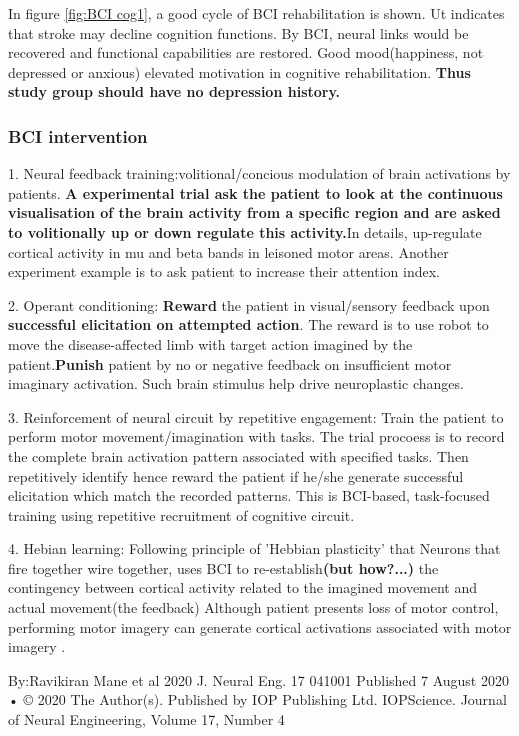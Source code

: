 \documentclass{article}
\begin{document}
In figure \ref{fig:BCI cog1}, a good cycle of BCI rehabilitation is shown. Ut indicates that stroke may decline cognition functions. By BCI, neural links would be recovered and functional capabilities are restored. Good mood(happiness, not depressed or anxious) elevated motivation in cognitive rehabilitation. \textbf{Thus study group should have no depression history.} \par

\subsubsection{BCI intervention}

1. Neural feedback training:volitional/concious modulation of brain activations by patients. \textbf{A experimental trial ask the patient to look at the continuous visualisation of the brain activity from a specific region and are asked to volitionally up or down regulate this activity.}In details, up-regulate cortical activity in mu and beta bands in leisoned motor areas. Another experiment example is to ask patient to increase their attention index.

2. Operant conditioning: \textbf{Reward} the patient in visual/sensory feedback upon \textbf{successful elicitation on attempted action}. The reward is to use robot to move the disease-affected limb with target action imagined by the patient.\textbf{Punish} patient by no or negative feedback on insufficient motor imaginary activation. Such brain stimulus help drive neuroplastic changes.

3. Reinforcement of neural circuit by repetitive engagement: Train the patient to perform motor movement/imagination with tasks. The trial procoess is to record the complete brain activation pattern associated with specified tasks. Then repetitively identify hence reward the patient if he/she generate successful elicitation which match the recorded patterns. This is BCI-based, task-focused training using repetitive recruitment of cognitive circuit.

4. Hebian learning: Following principle of 'Hebbian plasticity' that Neurons that fire together wire together,  uses BCI to re-establish\textbf{(but how?...)} the contingency between cortical activity related to the imagined movement and actual movement(the feedback) 
Although patient presents loss of motor control, performing motor imagery can generate cortical activations associated with motor imagery \cite{Mane_2020}. 

By:Ravikiran Mane et al 2020 J. Neural Eng. 17 041001
Published 7 August 2020 • © 2020 The Author(s). Published by IOP Publishing Ltd. IOPScience.
Journal of Neural Engineering, Volume 17, Number 4
\end{document}
